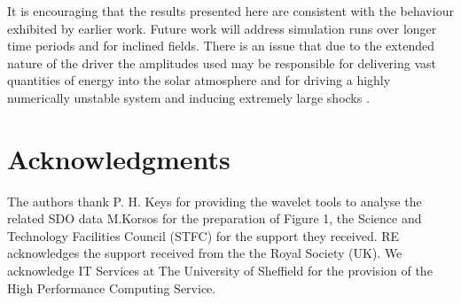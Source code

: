 \documentclass[linenumbers]{aastex63}
\begin{document}
It is encouraging that the results presented here are consistent with the behaviour exhibited  by earlier work. Future work will address simulation runs over longer time periods and for inclined fields. There is an issue that due to the extended nature of the driver the amplitudes used may be responsible for delivering vast quantities of energy into the solar atmosphere and for driving a highly numerically unstable system and inducing extremely large shocks \citet{Santamaria2015}. 


\section{Acknowledgments}

The authors thank P. H. Keys for providing the wavelet tools to analyse the related SDO data M.Korsos for the preparation of Figure 1, the Science and Technology Facilities Council (STFC) for the support they received.  RE acknowledges the support received from the the Royal Society (UK). We acknowledge IT Services at The University of Sheffield for the provision of the High Performance Computing Service.


%


\end{document}
